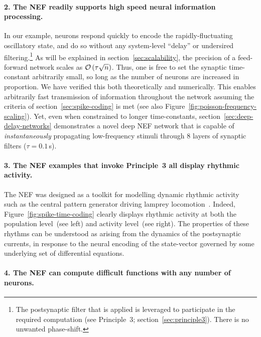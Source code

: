 \paragraph{2. The NEF readily supports high speed neural information processing.}

In our example, neurons respond quickly to encode the rapidly-fluctuating oscillatory state, and do so without any system-level ``delay'' or undersired filtering.\footnote{%
The postsynaptic filter that is applied is leveraged to participate in the required computation (see Principle~3; section~\ref{sec:principle3}).
There is no unwanted phase-shift.
}
As will be explained in section~\ref{sec:scalability}, the precision of a feed-forward network scales as $\mathcal{O}\left({\tau \sqrt{n}}\right)$.
Thus, one is free to set the synaptic time-constant arbitrarily small, so long as the number of neurons are increased in proportion.
We have verified this both theoretically and numerically.
This enables arbitrarily fast transmission of information throughout the network assuming the criteria of section~\ref{sec:spike-coding} is met (see also Figure~\ref{fig:poisson-frequency-scaling}).
Yet, even when constrained to longer time-constants, section~\ref{sec:deep-delay-networks} demonstrates a novel deep NEF network that is capable of \emph{instantaneously} propagating low-frequency stimuli through 8 layers of synaptic filters ($\tau = 0.1$\,s).

\paragraph{3. The NEF examples that invoke Principle~3 all display rhythmic activity.}

The NEF was designed as a toolkit for modelling dynamic rhythmic activity~\citep{eliasmith1999developing} such as the central pattern generator driving lamprey locomotion~\citep{eliasmith2000b}.
Indeed, Figure~\ref{fig:spike-time-coding} clearly displays rhythmic activity at both the population level~(see left) and activity level~(see right).
The properties of these rhythms can be understood as arising from the dynamics of the postsynaptic currents, in response to the neural encoding of the state-vector governed by some underlying set of differential equations.

\paragraph{4. The NEF can compute difficult functions with any number of neurons.}


